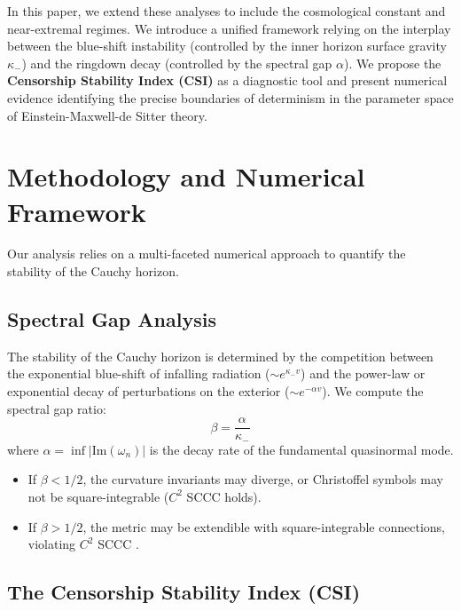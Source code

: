 \documentclass[12pt,a4paper]{article}
\begin{document}
In this paper, we extend these analyses to include the cosmological constant and near-extremal regimes. We introduce a unified framework relying on the interplay between the blue-shift instability (controlled by the inner horizon surface gravity $\kappa_-$) and the ringdown decay (controlled by the spectral gap $\alpha$). We propose the \textbf{Censorship Stability Index (CSI)} as a diagnostic tool and present numerical evidence identifying the precise boundaries of determinism in the parameter space of Einstein-Maxwell-de Sitter theory.

\section{Methodology and Numerical Framework}

Our analysis relies on a multi-faceted numerical approach to quantify the stability of the Cauchy horizon.

\subsection{Spectral Gap Analysis}

The stability of the Cauchy horizon is determined by the competition between the exponential blue-shift of infalling radiation ($\sim e^{\kappa_- v}$) and the power-law or exponential decay of perturbations on the exterior ($\sim e^{-\alpha v}$). We compute the spectral gap ratio:
\begin{equation}
\beta = \frac{\alpha}{\kappa_-}
\end{equation}
where $\alpha = \inf |\text{Im}(\omega_n)|$ is the decay rate of the fundamental quasinormal mode. 
\begin{itemize}
    \item If $\beta < 1/2$, the curvature invariants may diverge, or Christoffel symbols may not be square-integrable ($C^2$ SCCC holds).
    \item If $\beta > 1/2$, the metric may be extendible with square-integrable connections, violating $C^2$ SCCC \cite{cardoso2018}.
\end{itemize}

\subsection{The Censorship Stability Index (CSI)}
\end{document}
